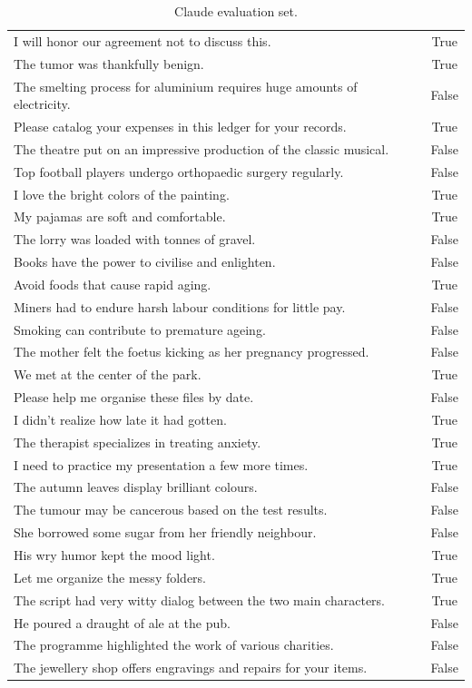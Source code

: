 \documentclass{article}
\begin{document}
\begin{table}[ht]
\begin{small}
{\begin{tabular}{|l|c|}
I will honor our agreement not to discuss this. & True \\
The tumor was thankfully benign. & True \\
The smelting process for aluminium requires huge amounts of electricity. & False \\
Please catalog your expenses in this ledger for your records. & True \\
The theatre put on an impressive production of the classic musical. & False \\
Top football players undergo orthopaedic surgery regularly. & False \\
I love the bright colors of the painting. & True \\
My pajamas are soft and comfortable. & True \\
The lorry was loaded with tonnes of gravel. & False \\
Books have the power to civilise and enlighten. & False \\
Avoid foods that cause rapid aging. & True \\
Miners had to endure harsh labour conditions for little pay. & False \\
Smoking can contribute to premature ageing. & False \\
The mother felt the foetus kicking as her pregnancy progressed. & False \\
We met at the center of the park. & True \\
Please help me organise these files by date. & False \\
I didn't realize how late it had gotten. & True \\
The therapist specializes in treating anxiety. & True \\
I need to practice my presentation a few more times. & True \\
The autumn leaves display brilliant colours. & False \\
The tumour may be cancerous based on the test results. & False \\
She borrowed some sugar from her friendly neighbour. & False \\
His wry humor kept the mood light. & True \\
Let me organize the messy folders. & True \\
The script had very witty dialog between the two main characters. & True \\
He poured a draught of ale at the pub. & False \\
The programme highlighted the work of various charities. & False \\
The jewellery shop offers engravings and repairs for your items. & False \\
\hline
\end{tabular}
}
\end{small}
\\[-5pt]
\caption{Claude evaluation set.}
\label{table:sentences4}
\end{table}

\end{document}
